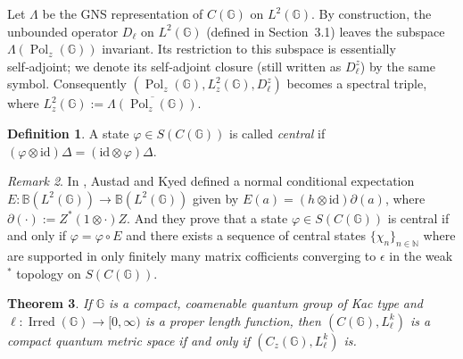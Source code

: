 \documentclass[12pt, reqno]{amsart}
\newtheorem{theorem}{Theorem}[section]
\theoremstyle{definition}
\newtheorem{definition}[theorem]{Definition}
\theoremstyle{remark}
\newtheorem{remark}[theorem]{Remark}
\numberwithin{equation}{section}
\begin{document}
Let $\Lambda$ be the GNS representation of $C(\mathbb{G})$ on $L^2(\mathbb{G})$. 
By construction, the unbounded operator $D_\ell$ on $L^2(\mathbb{G})$ (defined 
in Section~3.1) leaves the subspace $\Lambda(\operatorname{Pol}_z(\mathbb{G}))$ 
invariant. Its restriction to this subspace is essentially self‑adjoint; we 
denote its self‑adjoint closure (still written as $D_\ell^z$) by the same symbol. 
Consequently $(\operatorname{Pol}_z(\mathbb{G}), L^2_z(\mathbb{G}), D_\ell^z)$ 
becomes a spectral triple, where 
$L^2_z(\mathbb{G}) := \overline{\Lambda(\operatorname{Pol}_z(\mathbb{G}))}$.

\begin{definition}
    A state $\varphi\in S(C(\mathbb{G}))$ is called \emph{central} if 
    $(\varphi \otimes \mathrm{id})\Delta = (\mathrm{id}\otimes \varphi)\Delta$.
\end{definition}

\begin{remark}
    In \cite{16}, Austad and Kyed defined a normal conditional expectation 
    $E:\mathbb{B}(L^2(\mathbb{G}))\to \mathbb{B}(L^2(\mathbb{G}))$ given by 
    $E(a)=(h\otimes \mathrm{id})\partial(a)$, where 
    $\partial(\cdot):=Z^*(1\otimes \cdot)Z$. And they prove that a state 
    $\varphi\in S(C(\mathbb{G}))$ is central if and only if 
    $\varphi=\varphi \circ E$ and there exists a sequence of central states 
    $\{\chi_n\}_{n\in \mathbb{N}}$ where are supported in only finitely many matrix cofficients converging to $\epsilon$ in the weak$^*$ 
    topology on $S(C(\mathbb{G}))$.
\end{remark}

\begin{theorem}\label{compact quantum metric space}
 If $\mathbb{G}$ is a compact, coamenable quantum group of Kac type and 
 $\ell:\operatorname{Irred}(\mathbb{G})\to[0,\infty)$ is a proper length 
 function, then $(C(\mathbb{G}),L_\ell^k)$ is a compact quantum metric space 
 if and only if $(C_z(\mathbb{G}),L_\ell^k)$ is.
\end{theorem}
\end{document}
